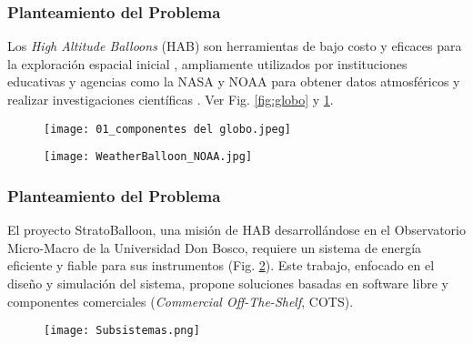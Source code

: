 

\begin{frame}
    \frametitle{Planteamiento del Problema}
    Los \emph{High Altitude Balloons} (HAB) son herramientas de bajo costo y eficaces para la exploración espacial inicial \cite{Saad2015}, ampliamente utilizados por instituciones educativas y agencias como la NASA \cite{noaa_radiosondes} y NOAA para obtener datos atmosféricos y realizar investigaciones científicas \cite{Jarrell2017}. Ver Fig. \ref{fig:globo} y \ref{fig:globo2}.

    \begin{figure}
        \centering
        \begin{minipage}{.5\textwidth}
            \centering
            \texttt{[image: 01\_componentes del globo.jpeg]} %
            \label{fig:globo}
        \end{minipage}\hfill
        \begin{minipage}{.5\textwidth}
            \centering
            \texttt{[image: WeatherBalloon\_NOAA.jpg]} %
            \label{fig:globo2}
        \end{minipage}
    \end{figure}
\end{frame}




\begin{frame}
    \frametitle{Planteamiento del Problema}
   El proyecto StratoBalloon, una misión de HAB desarrollándose en el Observatorio Micro-Macro de la Universidad Don Bosco, requiere un sistema de energía eficiente y fiable para sus instrumentos (Fig. \ref{fig:electronica}). Este trabajo, enfocado en el diseño y simulación del sistema, propone soluciones basadas en software libre y componentes comerciales (\emph{Commercial Off-The-Shelf}, COTS).

    \begin{figure}[H]
        \centering
        \texttt{[image: Subsistemas.png]} %
        \label{fig:electronica}
    \end{figure}
\end{frame}



